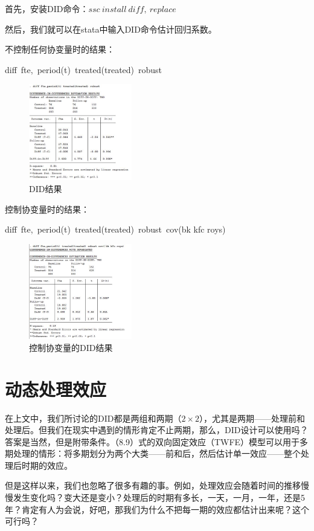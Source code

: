 \documentclass[cn,12pt,math=newtx,citestyle=gb7714-2015,bibstyle=gb7714-2015]{elegantbook}
\begin{document}
	首先，安装DID命令：$ssc~install~diff,~replace$
	
	然后，我们就可以在stata中输入DID命令估计回归系数。
	
	不控制任何协变量时的结果：
	
	diff~fte,~period(t)~treated(treated)~robust
	\begin{figure}[htbp!]
		\centering
		\includegraphics[width=0.4\textwidth]{DIDresults.jpg}
		\caption{DID结果}\label{fig:digit}
	\end{figure}
	
	控制协变量时的结果：
	
	diff~fte,~period(t)~treated(treated)~robust~cov(bk kfc roys)
	\begin{figure}[htbp!]
		\centering
		\includegraphics[width=0.4\textwidth]{DIDcov.jpg}
		\caption{控制协变量的DID结果}\label{fig:digit}
	\end{figure}
	
	
	\section{动态处理效应}
	
	在上文中，我们所讨论的DID都是两组和两期（$2 \times 2$），尤其是两期——处理前和处理后。但我们在现实中遇到的情形肯定不止两期，那么，DID设计可以使用吗？答案是当然，但是附带条件。（8.9）式的双向固定效应（TWFE）模型可以用于多期处理的情形：将多期划分为两个大类——前和后，然后估计单一效应——整个处理后时期的效应。
	
	但是这样以来，我们也忽略了很多有趣的事。例如，处理效应会随着时间的推移慢慢发生变化吗？变大还是变小？处理后的时期有多长，一天，一月，一年，还是5年？肯定有人为会说，好吧，那我们为什么不把每一期的效应都估计出来呢？这个可行吗？
	
\end{document}
